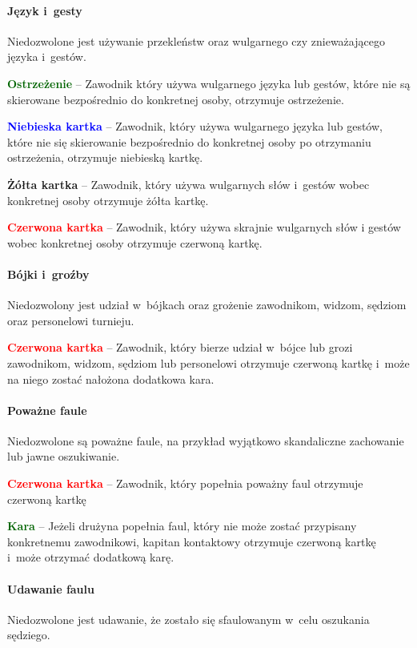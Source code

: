 \documentclass[12pt,a4paper]{article}
\newcommand\redcard[1]{\bgroup\textcolor{red}{\textbf{#1}}}
\newcommand\yellowcard[1]{\bgroup\textcolor{darkyellow}{\textbf{#1}}}
\newcommand\bluecard[1]{\bgroup\textcolor{blue}{\textbf{#1}}}
\newcommand\other[1]{\bgroup\textcolor{darkgreen}{\textbf{#1}}}
\begin{document}
\paragraph{Język i~gesty}
Niedozwolone jest używanie przekleństw
oraz wulgarnego czy znieważającego języka i~gestów.

\other{Ostrzeżenie} -- Zawodnik który używa wulgarnego języka lub gestów,
które nie są skierowane bezpośrednio do konkretnej osoby, otrzymuje
ostrzeżenie.

\bluecard{Niebieska kartka} -- Zawodnik, który używa wulgarnego języka lub
gestów, które nie się skierowanie bezpośrednio do konkretnej osoby po
otrzymaniu ostrzeżenia, otrzymuje niebieską kartkę.

\yellowcard{Żółta kartka} -- Zawodnik, który używa wulgarnych słów i~gestów
wobec konkretnej osoby otrzymuje żółta kartkę.

\redcard{Czerwona kartka} -- Zawodnik, który używa skrajnie wulgarnych słów
i gestów wobec konkretnej osoby otrzymuje czerwoną kartkę.

\paragraph{Bójki i~groźby}
Niedozwolony jest udział w~bójkach
oraz grożenie zawodnikom, widzom, sędziom oraz personelowi turnieju.

\redcard{Czerwona kartka} -- Zawodnik, który bierze udział w~bójce lub grozi
zawodnikom, widzom, sędziom lub personelowi otrzymuje czerwoną kartkę i~może na niego zostać nałożona dodatkowa kara.

\paragraph{Poważne faule}
Niedozwolone są poważne faule, na
przykład wyjątkowo skandaliczne zachowanie lub jawne oszukiwanie.

\redcard{Czerwona kartka} -- Zawodnik, który popełnia poważny faul otrzymuje
czerwoną kartkę

\other{Kara} -- Jeżeli drużyna popełnia faul, który nie może zostać
przypisany konkretnemu zawodnikowi, kapitan kontaktowy otrzymuje
czerwoną kartkę i~może otrzymać dodatkową karę.

\paragraph{Udawanie faulu}
Niedozwolone jest udawanie, że
zostało się sfaulowanym w~celu oszukania sędziego.
\end{document}
